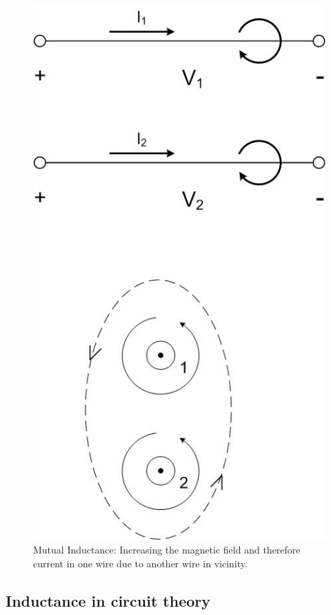 \documentclass{ximera}
\begin{document}
\begin{figure}[htbp]
\begin{center}
\includegraphics[scale=0.5]{../jpg/increaseinflux.jpg}
\end{center}
\caption{Mutual Inductance: Increasing the magnetic field and therefore current in one wire due to another wire in vicinity. }
\label{MutualInduc}
\end{figure}



\subsection{Inductance in circuit theory}
\end{document}
